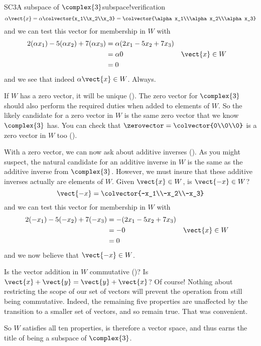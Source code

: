 \begin{example}{SC3}{A subspace of $\complex{3}$}{subspace!verification}
%
\begin{equation*}
\alpha\vect{x}=\alpha\colvector{x_1\\x_2\\x_3}=\colvector{\alpha x_1\\\alpha x_2\\\alpha x_3}
\end{equation*}
%
and we can test this vector for membership in $W$ with
%
\begin{align*}
2(\alpha x_1)-5(\alpha x_2)+7(\alpha x_3)
&=\alpha(2x_1-5x_2+7x_3)\\
&=\alpha 0&&\vect{x}\in W\\
&=0
\end{align*}
%
and we see that indeed $\alpha\vect{x}\in W$.  Always.\par
%
If $W$ has a zero vector, it will be unique ().  The zero vector for $\complex{3}$ should also perform the required duties when added to elements of $W$.  So the likely candidate for a zero vector in $W$ is the same zero vector that we know $\complex{3}$ has.  You can check that $\zerovector=\colvector{0\\0\\0}$ is a zero vector in $W$ too ().\par
%
With a zero vector, we can now ask about additive inverses ().  As you might suspect, the natural candidate for an additive inverse in $W$ is the same as the additive inverse from $\complex{3}$.  However, we must insure that these additive inverses actually are elements of $W$.  Given $\vect{x}\in W$, is $\vect{-x}\in W$?
%
\begin{equation*}
\vect{-x}=\colvector{-x_1\\-x_2\\-x_3}
\end{equation*}
%
and we can test this vector for membership in $W$ with
%
\begin{align*}
2(-x_1)-5(-x_2)+7(-x_3)
&=-(2x_1-5x_2+7x_3)\\
&=-0&&\vect{x}\in W\\
&=0
\end{align*}
%
and we now believe that $\vect{-x}\in W$.\par
%
Is the vector addition in $W$ commutative ()?  Is $\vect{x}+\vect{y}=\vect{y}+\vect{x}$?  Of course!  Nothing about restricting the scope of our set of vectors will prevent the operation from still being commutative.  Indeed, the remaining five properties are unaffected by the transition to a smaller set of vectors, and so remain true.  That was convenient.\par
%
So $W$ satisfies all ten properties, is therefore a vector space, and thus earns the title of being a subspace of $\complex{3}$.
%
\end{example}
